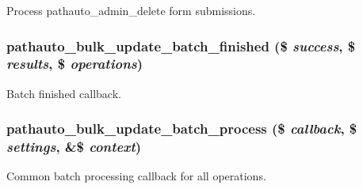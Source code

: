 \label{pathauto_8admin_8inc_a604d88306854d9908e302ead4896f77e}
Process pathauto\_\-admin\_\-delete form submissions. \hypertarget{pathauto_8admin_8inc_aa4e5f7dbb4b2173c5851759c4c4a6ac0}{
\subsubsection[{pathauto\_\-bulk\_\-update\_\-batch\_\-finished}]{\setlength{\rightskip}{0pt plus 5cm}pathauto\_\-bulk\_\-update\_\-batch\_\-finished (\$ {\em success}, \/  \$ {\em results}, \/  \$ {\em operations})}}
\label{pathauto_8admin_8inc_aa4e5f7dbb4b2173c5851759c4c4a6ac0}
Batch finished callback. \hypertarget{pathauto_8admin_8inc_a491859249088d2bd407d711cefc3f0aa}{
\subsubsection[{pathauto\_\-bulk\_\-update\_\-batch\_\-process}]{\setlength{\rightskip}{0pt plus 5cm}pathauto\_\-bulk\_\-update\_\-batch\_\-process (\$ {\em callback}, \/  \$ {\em settings}, \/  \&\$ {\em context})}}
\label{pathauto_8admin_8inc_a491859249088d2bd407d711cefc3f0aa}
Common batch processing callback for all operations.

